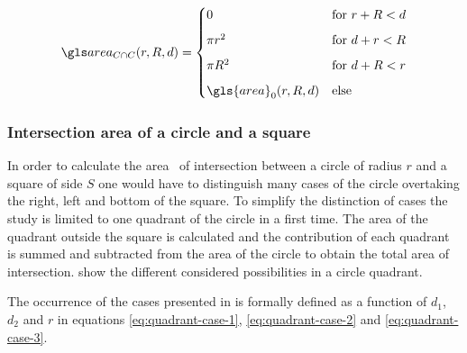 \begin{appendix}
\begin{minipage}{0.5\linewidth}
\end{minipage}%
\begin{minipage}{0.5\linewidth}
  \begin{equation}\label{eq:circle-circle-intersection}
    \circir (r, R, d) =
    \begin{cases}
      0 & \text{for } r + R < d \\[2mm]
      \pi r^2 & \text{for } d + r < R \\[2mm]
      \pi R^2 & \text{for } d + R < r \\[2mm]
      \gls{area}_0 (r, R, d) & \text{else}
    \end{cases}
  \end{equation}
\end{minipage}%

\subsubsection{Intersection area of a circle and a square}\label{sec:circle-square-intersection}


In order to calculate the area \cirsqr \ of intersection between a circle of radius \( r \) and a square of side \( S \) one would have to distinguish many cases of the circle overtaking the right, left and bottom of the square.
To simplify the distinction of cases the study is limited to one quadrant of the circle in a first time.
The area of the quadrant outside the square is calculated and the contribution of each quadrant is summed and subtracted from the area of the circle to obtain the total area of intersection.
 show the different considered possibilities in a circle quadrant.


\bigskip

The occurrence of the cases presented in  is formally defined as a function of \( d_1 \), \( d_2 \) and \( r \) in equations \eqref{eq:quadrant-case-1}, \eqref{eq:quadrant-case-2} and \eqref{eq:quadrant-case-3}.


\end{appendix}
